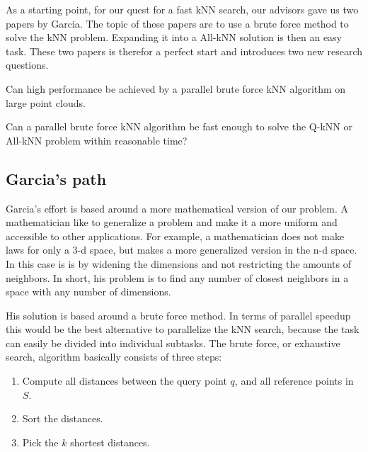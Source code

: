 As a starting point, for our quest for a fast kNN search, our advisors gave us two papers by Garcia\citep{Garcia2008, Garcia2010}. The topic of these papers are to use a brute force method to solve the kNN problem. Expanding it into a All-kNN solution is then an easy task. These two papers is therefor a perfect start and introduces two new research questions.  

\begin{myrq}
Can high performance be achieved by a parallel brute force kNN algorithm on large point clouds.
\label{rq:brute_force_performance}
\end{myrq}

\begin{myrq}
Can a parallel brute force kNN algorithm be fast enough to solve the Q-kNN or All-kNN problem within reasonable time?
\label{rq:brute_force_Q-kNN}
\end{myrq}


\subsection{Garcia's path} %
\label{sub:garcia_s_effort}
 
Garcia's effort is based around a more mathematical version of our problem. A mathematician like to generalize a problem and make it a more uniform and accessible to other applications. For example, a mathematician does not make laws for only a 3-d space, but makes a more generalized version in the n-d space. In this case is is by widening the dimensions and not restricting the amounts of neighbors. In short, his problem is to find any number of closest neighbors in a space with any number of dimensions.  

His solution is based around a brute force method. In terms of parallel speedup this would be the best alternative to parallelize the kNN search, because the task can easily be divided into individual subtasks. The brute force, or exhaustive search, algorithm basically consists of three steps:

\begin{enumerate}
       \item Compute all distances between the query point $q$, and all reference points in $S$.
       \item Sort the distances.
       \item Pick the $k$ shortest distances.
\end{enumerate}   



